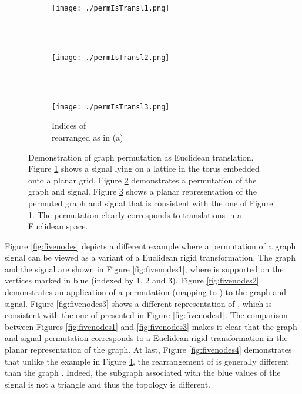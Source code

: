 \documentclass{article}
\begin{document}
\begin{figure}[!ht]
\centering
\begin{subfigure}{.25\textwidth}
	\centering
    \texttt{[image: ./permIsTransl1.png]}
    \caption{ \\ ~ }
\label{fig:permIsTransl1}
\end{subfigure}
{\large}\begin{subfigure}{.25\textwidth}
	\centering
    \texttt{[image: ./permIsTransl2.png]}
    \caption{ \\ ~ }
\label{fig:permIsTransl2}
\end{subfigure}
{\large}\begin{subfigure}{.25\textwidth}
	\centering
    \texttt{[image: ./permIsTransl3.png]}
    \caption{Indices of  \\ rearranged as in (a)}
\label{fig:permIsTransl3}
\end{subfigure}
\caption{Demonstration of graph permutation as Euclidean translation. Figure \ref{fig:permIsTransl1} shows a signal lying on a lattice in the torus embedded onto a  planar grid. Figure \ref{fig:permIsTransl2} demonstrates a permutation of the graph and signal. Figure \ref{fig:permIsTransl3} shows a planar representation of the permuted graph and signal that is consistent with the one of Figure \ref{fig:permIsTransl1}. The permutation clearly corresponds to translations in a Euclidean space.}
\label{fig:permIsTransl}
\end{figure}


Figure \ref{fig:fivenodes} depicts a different example where a permutation of a graph signal can be viewed {as a variant of a Euclidean rigid transformation.}
The graph  and the signal  are shown in Figure \ref{fig:fivenodes1}, where  is supported on the vertices marked in blue (indexed by 1, 2 and 3). Figure \ref{fig:fivenodes2} demonstrates an application of a permutation  (mapping  to ) to the graph and signal. Figure \ref{fig:fivenodes3} shows a different representation of , which is consistent with the one of  presented in Figure \ref{fig:fivenodes1}. The comparison between Figures \ref{fig:fivenodes1} and \ref{fig:fivenodes3} makes it clear that the graph and signal permutation corresponds to a Euclidean {rigid transformation} in the planar representation of the graph.  At last, Figure \ref{fig:fivenodes4} demonstrates that unlike the example in Figure \ref{fig:permIsTransl}, the rearrangement of 
is generally different than 
the graph . {Indeed, the subgraph associated with the blue values of the signal is not a triangle and thus the topology is different. }
\end{document}

